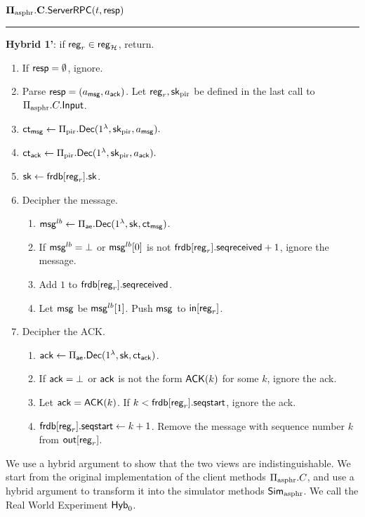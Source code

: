 \vspace{10pt}
$\mathbf{\Pi_{\text{asphr}}.C.\mathsf{ServerRPC}}(t, \mathsf{resp})$
\vspace{5pt}
\hrule
\vspace{5pt}
{\color{red} \textbf{Hybrid 1'}: if $\mathsf{reg}_r \in \mathsf{reg}_{\mathcal{H}}$, return.}
\begin{enumerate}
    \item If $\mathsf{resp} = \emptyset$, ignore.
    \item Parse $\mathsf{resp} = (a_{\mathsf{msg}}, a_{\mathsf{ack}})$. Let $\mathsf{reg}_r, {\mathsf{sk}}_{\text{pir}}$ be defined in the last call to $\Pi_{\text{asphr}}.C.\mathsf{Input}$.
    \item $\mathsf{ct}_{\mathsf{msg}} \leftarrow \Pi_{\text{pir}}.\mathsf{Dec}(1^{\lambda}, {\mathsf{sk}}_{\text{pir}}, a_{\mathsf{msg}}).$
    \item $\mathsf{ct}_{\mathsf{ack}} \leftarrow \Pi_{\text{pir}}.\mathsf{Dec}(1^{\lambda}, {\mathsf{sk}}_{\text{pir}}, a_{\mathsf{ack}}).$
    \item ${\mathsf{sk}} \leftarrow \mathsf{frdb}[\mathsf{reg}_r].{\mathsf{sk}}$.
    \item Decipher the message.
    \begin{enumerate}
        \item $\mathsf{msg}^{lb} \leftarrow \Pi_{\mathsf{ae}}.\mathsf{Dec}(1^{\lambda}, {\mathsf{sk}}, \mathsf{ct}_{\mathsf{msg}})$.
        \item If $\mathsf{msg}^{lb} = \bot$ or $\mathsf{msg}^{lb}[0]$ is not $\mathsf{frdb}[\mathsf{reg}_r].\mathsf{seqreceived} + 1$, ignore the message.
        \item Add $1$ to $\mathsf{frdb}[\mathsf{reg}_r].\mathsf{seqreceived}$. 
        \item Let $\mathsf{msg}$ be $\mathsf{msg}^{lb}[1]$. Push $\mathsf{msg}$ to $\mathsf{in}[\mathsf{reg}_r]$.
    \end{enumerate}
    \item Decipher the ACK.
    \begin{enumerate}
        \item $\mathsf{ack} \leftarrow \Pi_{\mathsf{ae}}.\mathsf{Dec}(1^{\lambda}, {\mathsf{sk}}, \mathsf{ct}_{\mathsf{ack}})$.
        \item If $\mathsf{ack} = \bot$ or $\mathsf{ack}$ is not the form $\mathsf{ACK}(k)$ for some $k$, ignore the ack.
        \item Let $\mathsf{ack} = \mathsf{ACK}(k)$. If $k < \mathsf{frdb}[\mathsf{reg}_r].\mathsf{seqstart}$, ignore the ack.
        \item $\mathsf{frdb}[\mathsf{reg}_r].\mathsf{seqstart} \leftarrow k + 1$. Remove the message with sequence number $k$ from $\mathsf{out}[\mathsf{reg}_r]$.
    \end{enumerate}
\end{enumerate}

We use a hybrid argument to show that the two views are indistinguishable. We start from the original implementation of the client methods $\Pi_{\text{asphr}}.C$, and use a hybrid argument to transform it into the simulator methods $\mathsf{Sim}_{\text{asphr}}$. We call the Real World Experiment $\mathsf{Hyb}_0$.  

